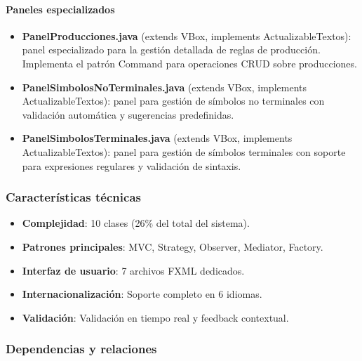 \paragraph{Paneles especializados}
\begin{itemize}
    \item \textbf{PanelProducciones.java} (extends VBox, implements ActualizableTextos): panel especializado para la gestión detallada de reglas de producción. Implementa el patrón Command para operaciones CRUD sobre producciones.

    \item \textbf{PanelSimbolosNoTerminales.java} (extends VBox, implements ActualizableTextos): panel para gestión de símbolos no terminales con validación automática y sugerencias predefinidas.

    \item \textbf{PanelSimbolosTerminales.java} (extends VBox, implements ActualizableTextos): panel para gestión de símbolos terminales con soporte para expresiones regulares y validación de sintaxis.
\end{itemize}

\subsubsection{Características técnicas}
\begin{itemize}
    \item \textbf{Complejidad}: 10 clases (26\% del total del sistema).
    \item \textbf{Patrones principales}: MVC, Strategy, Observer, Mediator, Factory.
    \item \textbf{Interfaz de usuario}: 7 archivos FXML dedicados.
    \item \textbf{Internacionalización}: Soporte completo en 6 idiomas.
    \item \textbf{Validación}: Validación en tiempo real y feedback contextual.
\end{itemize}

\subsubsection{Dependencias y relaciones}


